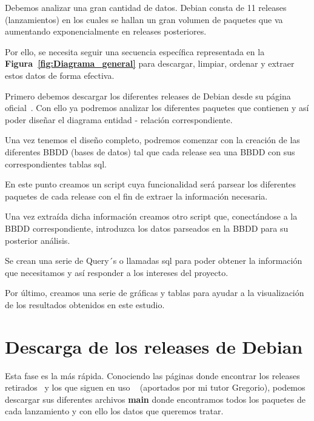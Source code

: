 \documentclass[a4paper, 12pt]{book}
\begin{document}
Debemos analizar una gran cantidad de datos. Debian consta de 11 releases (lanzamientos) en los cuales se hallan un gran volumen de paquetes que va aumentando exponencialmente en releases posteriores.

Por ello, se necesita seguir una secuencia específica representada en la \textbf {Figura~\ref{fig:Diagrama_general}} para descargar, limpiar, ordenar y extraer estos datos de forma efectiva. 

Primero debemos descargar los diferentes releases de Debian desde su página oficial~\cite{oficialdebian:_releases}.
Con ello ya podremos analizar los diferentes paquetes que contienen y así poder diseñar el diagrama entidad - relación correspondiente.

Una vez tenemos el diseño completo, podremos comenzar con la creación de las diferentes BBDD (bases de datos) tal que cada release sea una BBDD con sus correspondientes tablas sql.

En este punto creamos un script cuya funcionalidad será parsear los diferentes paquetes de cada release con el fin de extraer la información necesaria.

Una vez extraída dicha información creamos otro script que, conectándose a la BBDD correspondiente, introduzca los datos parseados en la BBDD para su posterior análisis.

Se crean una serie de Query´s o llamadas sql para poder obtener la información que necesitamos y así responder a los intereses del proyecto.

Por último, creamos una serie de gráficas y tablas para ayudar a la visualización de los resultados obtenidos en este estudio.


\section{Descarga de los releases de Debian} 
\label{sec:Descarga_de_los_releases_de_Debian}

Esta fase es la más rápida. Conociendo las páginas donde encontrar los releases retirados~\cite{debian:_releases_archive} y los que siguen en uso ~\cite{debian:_releases} (aportados por mi tutor Gregorio), podemos descargar sus diferentes archivos \textbf{main} donde encontramos todos los paquetes de cada lanzamiento y con ello los datos que queremos tratar.
\end{document}
